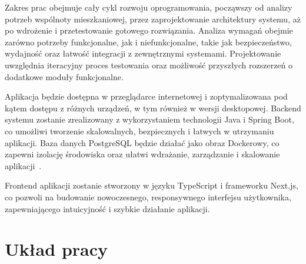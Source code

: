 Zakres prac obejmuje cały cykl rozwoju oprogramowania, począwszy od analizy potrzeb wspólnoty mieszkaniowej, przez zaprojektowanie architektury systemu, aż po wdrożenie i przetestowanie gotowego rozwiązania. Analiza wymagań obejmie zarówno potrzeby funkcjonalne, jak i niefunkcjonalne, takie jak bezpieczeństwo, wydajność oraz łatwość integracji z zewnętrznymi systemami. Projektowanie uwzględnia iteracyjny proces testowania oraz możliwość przyszłych rozszerzeń o dodatkowe moduły funkcjonalne.

Aplikacja będzie dostępna w przeglądarce internetowej i zoptymalizowana pod kątem dostępu z różnych urządzeń, w tym również w wersji desktopowej. Backend systemu zostanie zrealizowany z wykorzystaniem technologii Java i Spring Boot, co umożliwi tworzenie skalowalnych, bezpiecznych i łatwych w utrzymaniu aplikacji. Baza danych PostgreSQL będzie działać jako obraz Dockerowy, co zapewni izolację środowiska oraz ułatwi wdrażanie, zarządzanie i skalowanie aplikacji~\cite{EARTHLY}.

Frontend aplikacji zostanie stworzony w języku TypeScript i frameworku Next.js, co pozwoli na budowanie nowoczesnego, responsywnego interfejsu użytkownika, zapewniającego intuicyjność i szybkie działanie aplikacji.

\section{Układ pracy}
